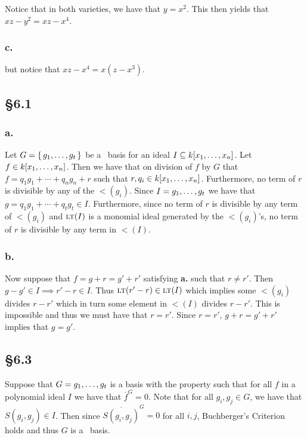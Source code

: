 \documentclass[letterpaper]{article}
\begin{document}
Notice that in both varieties, we have that $y = x^{2}$.
This then yields that $xz - y^{2} = xz - x^{4}$.

\subsubsection*{c.}

 but notice that $xz - x^{4} = x(z - x^{3})$.

\subsection*{\S 6.1}

\subsubsection*{a.}

Let $G = \set{g_{1}, \ldots, g_{t}}$ be a \Grobner\ basis for an ideal $I \subseteq k\bqty{x_{1}, \ldots, x_{n}}$.
Let $f \in k\bqty{x_{1}, \ldots, x_{n}}$.
Then we have that on division of $f$ by $G$ that $f = q_{1}g_{1} + \cdots + q_{n}g_{n} + r$ such that $r, q_{i} \in k\bqty{x_{1}, \ldots, x_{n}}$.
Furthermore, no term of $r$ is divisible by any of the $\lt(g_{i})$.
Since $I = \gen{g_{1}, \ldots, g_{t}}$ we have that $g = q_{1}g_{1} + \cdots + q_{t}g_{t} \in I$.
Furthermore, since no term of $r$ is divisible by any term of $\lt(g_{i})$ and $\gen{\lt(I)}$ is a monomial ideal generated by the $\lt(g_{i})$'s, no term of $r$ is divisible by any term in $\lt(I)$.

\subsubsection*{b.}

Now suppose that $f = g + r = g' + r'$ satisfying \textbf{a.} such that $r \neq r'$.
Then $g - g' \in I \implies r' - r \in I$.
Thus $\lt(r' - r) \in \gen{\lt(I)}$ which implies some $\lt(g_{i})$ divides $r - r'$ which in turn some element in $\lt(I)$ divides $r - r'$.
This is impossible and thus we must have that $r = r'$.
Since $r = r'$, $g + r = g' + r'$ implies that $g = g'$.

\subsection*{\S 6.3}

Suppose that $G = \gen{g_{1}, \ldots, g_{t}}$ is a basis with the property such that for all $f$ in a polynomial ideal $I$ we have that $\overline{f}^{G} = 0$.
Note that for all $g_{i}, g_{j} \in G$, we have that $S(g_{i}, g_{j}) \in I$.
Then since $\overline{S(g_{i}, g_{j})}^{G} = 0$ for all $i, j$, Buchberger's Criterion holds and thus $G$ is a \Grobner\ basis.
\end{document}
